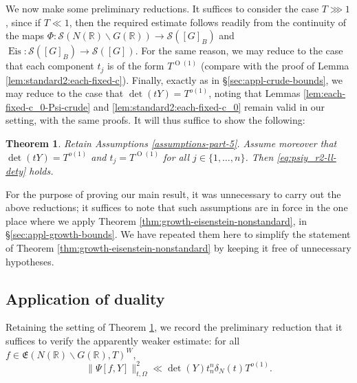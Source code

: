 \documentclass[reqno]{amsart}
\def\O{\operatorname{O}}
\DeclareMathOperator{\Eis}{Eis}
\theoremstyle{plain} \newtheorem{theorem} {Theorem}
\theoremstyle{definition} \newtheorem{definition} [theorem] {Definition}
\theoremstyle{itplain} %
\numberwithin{equation}{section}
\numberwithin{theorem}{section}
\begin{document}
We now make some preliminary reductions.  It suffices to consider the case $T \ggg 1$, since if $T \ll 1$, then the required estimate follows readily from the continuity of the maps $\Phi : \mathcal{S}(N(\mathbb{R}) \backslash G(\mathbb{R})) \rightarrow \mathcal{S}([G]_B)$ and $\Eis : \mathcal{S}([G]_B) \rightarrow \mathcal{S}([G])$.  For the same reason, we may reduce to the case that each component $t_j$ is of the form $T^{\O(1)}$ (compare with the proof of Lemma \ref{lem:standard2:each-fixed-c}).  Finally, exactly as in \S\ref{sec:appl-crude-bounds}, we may reduce to the case that $\det(t Y) = T^{o(1)}$, noting that Lemmas \ref{lem:each-fixed-c_0-Psi-crude} and \ref{lem:standard2:each-fixed-c_0} remain valid in our setting, with the same proofs.  It will thus suffice to show the following:
\begin{theorem}\label{thm:sub-gln:let-r-as}
  Retain Assumptions \ref{assumptions-part-5}.  Assume moreover that $\det(t Y) = T^{o(1)}$ and $t_j = T^{\O(1)}$ for all $j \in \{1, \dotsc, n\}$.  Then
  \eqref{eq:psiy_r2-ll-dety} holds.
\end{theorem}

\begin{remark}
  For the purpose of proving our main result, it was unnecessary to carry out the above reductions; it suffices to note that such assumptions are in force in the one place where we apply Theorem \ref{thm:growth-eisenstein-nonstandard}, in \S\ref{sec:appl-growth-bounds}.  We have repeated them here to simplify the statement of Theorem \ref{thm:growth-eisenstein-nonstandard} by keeping it free of unnecessary hypotheses.
\end{remark}

\subsection{Application of duality}
Retaining the setting of Theorem \ref{thm:sub-gln:let-r-as}, we record the preliminary reduction that it suffices to verify the apparently weaker estimate: for all $f \in  \mathfrak{E}(N(\mathbb{R}) \backslash G(\mathbb{R}), T)^W$,
\begin{equation}\label{eq:psiy_r2-ll-dety-1}
  \|\Psi[f,Y]\|_{t,\Omega}^2 \ll
  \det(Y)
  t_n^n \delta_N(t) T^{o(1)}.
\end{equation}
\end{document}
